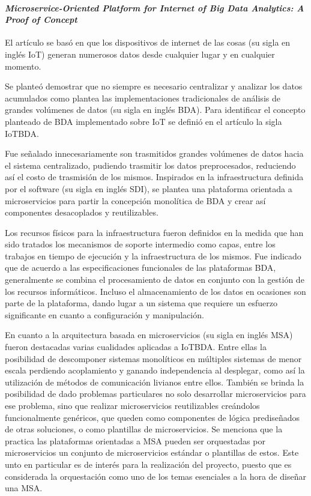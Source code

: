 \paragraph{\textbf{
    \emph{ Microservice-Oriented Platform for Internet of Big Data Analytics: A Proof of Concept }
} \cite{li_microservice-oriented_2019}} 

El artículo se basó en que los dispositivos de internet de las cosas (su sigla en inglés IoT) generan numerosos datos desde cualquier lugar y en cualquier momento.

Se planteó demostrar que no siempre es necesario centralizar y analizar los datos acumulados como plantea las implementaciones tradicionales de análisis de grandes volúmenes de datos (su sigla en inglés BDA). Para identificar el concepto planteado de BDA implementado sobre IoT se definió en el artículo la sigla IoTBDA.

Fue señalado innecesariamente son trasmitidos grandes volúmenes de datos hacia el sistema centralizado, pudiendo trasmitir los datos preprocesados, reduciendo así el costo de trasmisión de los mismos. 
Inspirados en la infraestructura definida por el software (su sigla en inglés SDI), se plantea una plataforma orientada a microservicios para partir la concepción monolítica de BDA y crear así componentes desacoplados y reutilizables.

Los recursos físicos para la infraestructura fueron definidos en la medida que han sido tratados los mecanismos de soporte intermedio como capas, entre los trabajos en tiempo de ejecución y la infraestructura de los mismos.
Fue indicado que  de acuerdo a las especificaciones funcionales de las plataformas BDA, generalmente se combina el procesamiento de datos en conjunto con la gestión de los recursos informáticos. Incluso el almacenamiento de los datos en ocasiones son parte de la plataforma, dando lugar a un sistema que requiere un esfuerzo significante en cuanto a configuración y manipulación.

En cuanto a la arquitectura basada en microservicios (su sigla en inglés MSA) fueron destacadas varias cualidades aplicadas a IoTBDA. Entre ellas la posibilidad de descomponer sistemas monolíticos en múltiples sistemas de menor escala perdiendo acoplamiento y ganando independencia al desplegar, como así la utilización de métodos de comunicación livianos entre ellos. También se brinda la posibilidad de dado problemas particulares no solo desarrollar microservicios para ese problema, sino que realizar microservicios reutilizables creándolos funcionalmente genéricos, que queden como componentes de lógica prediseñados de otras soluciones, o como plantillas de microservicios. Se menciona que la practica las plataformas orientadas a MSA pueden ser orquestadas por microservicios un conjunto de microservicios estándar o plantillas de estos. Este unto en particular es de interés para la realización del proyecto, puesto que es considerada la orquestación como uno de los temas esenciales  a  la hora de diseñar una MSA. 

